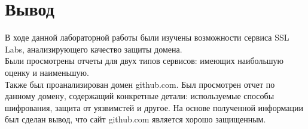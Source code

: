 \documentclass[10pt,a4paper]{report}
\begin{document}
\section{Вывод}
В ходе данной лабораторной работы были изучены возможности сервиса SSL Labs, анализирующего качество защиты домена. \\
Были просмотрены отчеты для двух типов сервисов: имеющих наибольшую оценку и наименьшую. \\
Также был проанализирован домен github.com. Был просмотрен отчет по данному домену, содержащий конкретные детали: используемые способы шифрования, защита от уязвимстей и другое. На основе полученной информации был сделан вывод, что сайт github.com является хорошо защищенным.
\end{document}
